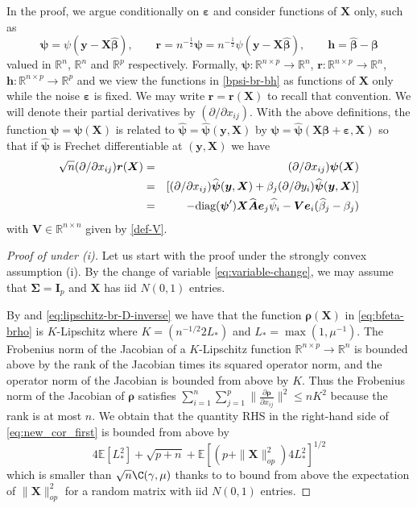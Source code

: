 \documentclass[11pt]{amsart}
\numberwithin{equation}{section}
\numberwithin{equation}{section}
\newcommand{\bel}{\begin{eqnarray}\label}
\newcommand{\eel}{\end{eqnarray}}
\def\real{{\mathbb{R}}}
\def\R{{\real}}
\def\E{{\mathbb{E}}}
\def\diag{\hbox{\rm diag}}
\def\mathbold{\boldsymbol} %
\def\bA{\mathbold{A}}\def\calA{{\cal A}}\def\scrA{{\mathscr A}}\def\Ahat{\widehat{A}}\def\Atil{{\widetilde A}}
\def\hbA{{\widehat{\bA}}}\def\tbA{{\widetilde{\bA}}}
\def\bh{\mathbold{h}}\def\hhat{\widehat{h}}\def\htil{\widetilde{h}}
\def\bI{\mathbold{I}}\def\hbI{{\widehat{\bI}}}\def\tbI{{\widetilde{\bI}}}
\def\br{\mathbold{r}}\def\rhat{\widehat{r}}\def\rtil{\widetilde{r}}\def\rbar{{\overline r}}\def\brbar{{\overline \br}}
\def\be{\mathbold{e}}
\def\bV{\mathbold{V}}\def\hbV{{\widehat{\bV}}}\def\tbV{{\widetilde{\bV}}}
\def\bX{\mathbold{X}}\def\hbX{{\widehat{\bX}}}\def\tbX{{\widetilde{\bX}}}\def\bXbar{{\overline \bX}}
\def\by{\mathbold{y}}\def\yhat{\widehat{y}}\def\ytil{\widetilde{y}}\def\ybar{{\overline y}}\def\vby{{\bf y}}
\def\bbeta{\mathbold{\beta}}\def\betahat{\widehat{\beta}}\def\hbeta{\widehat{\beta}}
\def\hbbeta{{{\widehat{\bbeta}}}}
\def\ep{\varepsilon}\def\eps{\epsilon}\def\veps{\varepsilon}
\def\bep{ {\mathbold{\ep} }}
\def\brho{\mathbold{\rho}}\def\rhohat{\widehat{\rho}}\def\hrho{\widehat{\rho}}
\def\bSigma{\mathbold{\Sigma}}\def\hbSigma{{\widehat{\bSigma}}}
\def\bpsi{\mathbold{\psi}}\def\psihat{\widehat{\psi}}\def\hpsi{\widehat{\psi}}
\def\hbpsi{{\widehat{\bpsi}}}\def\tbpsi{{\widetilde{\bpsi}}}
\begin{document}
{In the proof, we argue conditionally on $\bep$ and consider functions of $\bX$ only, such as
\begin{equation}
    \label{bpsi-br-bh}
    \bpsi = \psi(\by-\bX\hbbeta), \qquad \br = n^{-\frac12}\bpsi = n^{-\frac12}\psi(\by-\bX\hbbeta),
\qquad
\bh = \hbbeta-\bbeta
\end{equation}
valued in $\R^n$, $\R^n$ and $\R^p$ respectively.
Formally, 
$\bpsi:\R^{n\times p}\to\R^n$,
$\br:\R^{n\times p}\to\R^n$,
$\bh:\R^{n\times p}\to \R^p$
and we view the functions in \eqref{bpsi-br-bh}
as functions of $\bX$ only while the noise $\bep$ is fixed.
We may write $\br=\br(\bX)$ to recall that convention.
We will denote their partial derivatives by $(\partial/\partial x_{ij})$.
With the above definitions,
the function $\bpsi=\bpsi(\bX)$ is related to $\hbpsi=\hbpsi(\by,\bX)$ by
$\bpsi = \hbpsi(\bX\bbeta + \bep,\bX)$ so that 
if $\hbpsi$ is Frechet differentiable at $(\by,\bX)$ we have
\bel{eq:chain-rule-r}
  \sqrt n  
  (\partial/\partial x_{ij})\br (\bX)
  &=&
  (\partial/\partial x_{ij})\bpsi (\bX)
\cr&=&
[(\partial/\partial x_{ij})\hbpsi(\by,\bX) + \beta_j(\partial/\partial y_i)\hbpsi(\by,\bX) ]
\cr&=&
- \diag(\bpsi')\bX\hbA\be_j \hpsi_i
- \bV \be_i (\hbeta_j-\beta_j)
\eel
with $\bV\in\R^{n\times n}$ given by \eqref{def-V}.

\begin{proof}[Proof of  under (i)]
    Let us start with the proof under the strongly convex assumption
    (i). By the change of variable \eqref{eq:variable-change},
    we may assume that $\bSigma=\bI_p$ and $\bX$ has iid $N(0,1)$ entries.

    By  and \eqref{eq:lipschitz-br-D-inverse}
    we have that the function $\brho(\bX)$ in \eqref{eq:bfeta-brho}
    is $K$-Lipschitz where $K=(n^{-1/2} 2 L_*)$ and $L_*=\max(1,\mu^{-1})$.
    The Frobenius norm of the Jacobian of a $K$-Lipschitz function
    $\R^{n\times p}\to \R^n$ is bounded above by the rank of the Jacobian
    times its squared operator norm, and the operator norm of the Jacobian
    is bounded from above by $K$. Thus the Frobenius norm of the Jacobian
    of $\brho$ satisfies 
    $\sum_{i=1}^n\sum_{j=1}^p \|\frac{\partial \brho}{\partial x_{ij}}
    \|^2
    \le n K^2$ because the rank is at most $n$.
    We obtain that the quantity
    RHS in the right-hand side of \eqref{eq:new_cor_first} is bounded
    from above by 
    \begin{equation}
        4\E[L_*^2] + \sqrt{p+n} + \E[(p+\|\bX\|_{op}^2)4L_*^2]^{1/2}
        \label{eq:RHS_2_18}
    \end{equation}
    which is smaller than $\sqrt n \C(\gamma,\mu)$ thanks to
     to bound from above
    the expectation of $\|\bX\|_{op}^2$ for a random matrix with iid $N(0,1)$
    entries.


\end{proof}}
\end{document}

